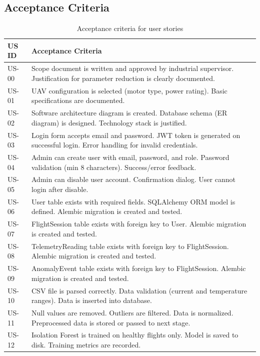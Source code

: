 \subsection{Acceptance Criteria}

\begin{table}[H]
\centering
\caption{Acceptance criteria for user stories}
\begin{tabular}{|p{1.5cm}|p{10cm}|}
\hline
\textbf{US ID} & \textbf{Acceptance Criteria} \\
\hline
US-00 & Scope document is written and approved by industrial supervisor. Justification for parameter reduction is clearly documented. \\
\hline
US-01 & UAV configuration is selected (motor type, power rating). Basic specifications are documented. \\
\hline
US-02 & Software architecture diagram is created. Database schema (ER diagram) is designed. Technology stack is justified. \\
\hline
US-03 & Login form accepts email and password. JWT token is generated on successful login. Error handling for invalid credentials. \\
\hline
US-04 & Admin can create user with email, password, and role. Password validation (min 8 characters). Success/error feedback. \\
\hline
US-05 & Admin can disable user account. Confirmation dialog. User cannot login after disable. \\
\hline
US-06 & User table exists with required fields. SQLAlchemy ORM model is defined. Alembic migration is created and tested. \\
\hline
US-07 & FlightSession table exists with foreign key to User. Alembic migration is created and tested. \\
\hline
US-08 & TelemetryReading table exists with foreign key to FlightSession. Alembic migration is created and tested. \\
\hline
US-09 & AnomalyEvent table exists with foreign key to FlightSession. Alembic migration is created and tested. \\
\hline
US-10 & CSV file is parsed correctly. Data validation (current and temperature ranges). Data is inserted into database. \\
\hline
US-11 & Null values are removed. Outliers are filtered. Data is normalized. Preprocessed data is stored or passed to next stage. \\
\hline
US-12 & Isolation Forest is trained on healthy flights only. Model is saved to disk. Training metrics are recorded. \\

\end{tabular}
\end{table}
